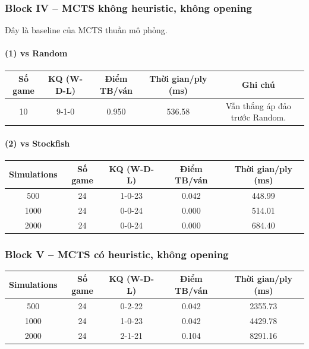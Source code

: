 \subsubsection{Block IV -- MCTS không heuristic, không opening}

Đây là baseline của MCTS thuần mô phỏng.

\paragraph*{(1) vs Random}

\begin{center}
\begin{tabular}{|c|c|c|c|c|}
\hline
\textbf{Số game} & \textbf{KQ (W-D-L)} & \textbf{Điểm TB/ván} & \textbf{Thời gian/ply (ms)} & \textbf{Ghi chú} \\
\hline
10 & 9-1-0 & 0.950 & 536.58 & Vẫn thắng áp đảo trước Random. \\
\hline
\end{tabular}
\end{center}

\paragraph*{(2) vs Stockfish}

\begin{center}
\begin{tabular}{|c|c|c|c|c|}
\hline
\textbf{Simulations} & \textbf{Số game} & \textbf{KQ (W-D-L)} & \textbf{Điểm TB/ván} & \textbf{Thời gian/ply (ms)} \\
\hline
500 & 24 & 1-0-23 & 0.042 & 448.99 \\
\hline
1000 & 24 & 0-0-24 & 0.000 & 514.01 \\
\hline
2000 & 24 & 0-0-24 & 0.000 & 684.40 \\
\hline
\end{tabular}
\end{center}

\subsubsection{Block V -- MCTS có heuristic, không opening}

\begin{center}
\begin{tabular}{|c|c|c|c|c|}
\hline
\textbf{Simulations} & \textbf{Số game} & \textbf{KQ (W-D-L)} & \textbf{Điểm TB/ván} & \textbf{Thời gian/ply (ms)} \\
\hline
500 & 24 & 0-2-22 & 0.042 & 2355.73 \\
\hline
1000 & 24 & 1-0-23 & 0.042 & 4429.78 \\
\hline
2000 & 24 & 2-1-21 & 0.104 & 8291.16 \\
\hline
\end{tabular}
\end{center}


